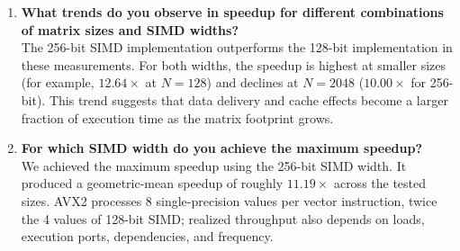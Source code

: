 \begin{enumerate}
    \item \textbf{What trends do you observe in speedup for different combinations of matrix sizes and SIMD widths?} \\
    The 256-bit SIMD implementation outperforms the 128-bit implementation in these measurements. For both widths, the speedup is highest at smaller sizes (for example, $12.64\times$ at $N=128$) and declines at $N=2048$ ($10.00\times$ for 256-bit). This trend suggests that data delivery and cache effects become a larger fraction of execution time as the matrix footprint grows.
    
    \item \textbf{For which SIMD width do you achieve the maximum speedup?} \\
    We achieved the maximum speedup using the 256-bit SIMD width. It produced a geometric-mean speedup of roughly $11.19\times$ across the tested sizes. AVX2 processes 8 single-precision values per vector instruction, twice the 4 values of 128-bit SIMD; realized throughput also depends on loads, execution ports, dependencies, and frequency.
\end{enumerate}
